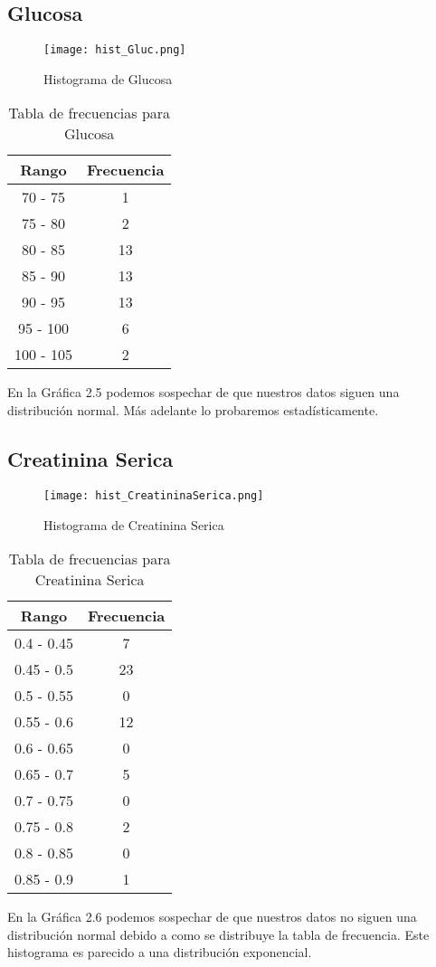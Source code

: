 \documentclass[12pt]{report}
\begin{document}
\subsection{Glucosa}
\begin{figure}[H]
    \centering
    \texttt{[image: hist\_Gluc.png]}
    \caption{Histograma de Glucosa}
\end{figure}

\begin{table}[H]
    \centering
    \begin{tabular}{|c|c|}
        \hline
        \textbf{Rango} & \textbf{Frecuencia} \\
        \hline
        70 - 75 & 1 \\
        75 - 80 & 2 \\
        80 - 85 & 13 \\
        85 - 90 & 13 \\
        90 - 95 & 13 \\
        95 - 100 & 6 \\
        100 - 105 & 2 \\
        \hline
    \end{tabular}
    \caption{Tabla de frecuencias para Glucosa}
\end{table}
\noindent En la Gráfica 2.5 podemos sospechar de que nuestros datos siguen una distribución normal. Más adelante lo probaremos estadísticamente.

\subsection{Creatinina Serica}
\begin{figure}[H]
    \centering
    \texttt{[image: hist\_CreatininaSerica.png]}
    \caption{Histograma de Creatinina Serica}
\end{figure}

\begin{table}[H]
    \centering
    \begin{tabular}{|c|c|}
        \hline
        \textbf{Rango} & \textbf{Frecuencia} \\
        \hline
        0.4 - 0.45 & 7 \\
        0.45 - 0.5 & 23 \\
        0.5 - 0.55 & 0 \\
        0.55 - 0.6 & 12 \\
        0.6 - 0.65 & 0 \\
        0.65 - 0.7 & 5 \\
        0.7 - 0.75 & 0 \\
        0.75 - 0.8 & 2 \\
        0.8 - 0.85 & 0 \\
        0.85 - 0.9 & 1 \\
        \hline
    \end{tabular}
    \caption{Tabla de frecuencias para Creatinina Serica}
\end{table}
\noindent En la Gráfica 2.6 podemos sospechar de que nuestros datos no siguen una distribución normal debido a como se distribuye la tabla de frecuencia. Este histograma es parecido a una distribución exponencial.
\end{document}
